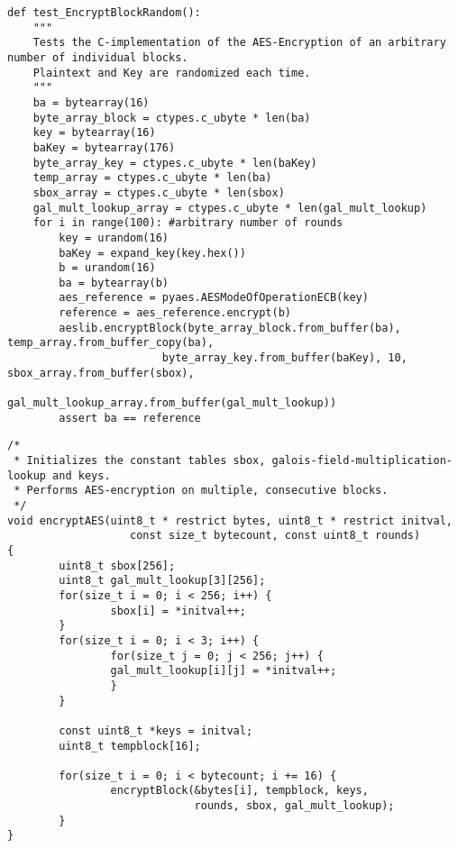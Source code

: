 \begin{lstlisting}
def test_EncryptBlockRandom():
    """
    Tests the C-implementation of the AES-Encryption of an arbitrary number of individual blocks.
    Plaintext and Key are randomized each time.
    """
    ba = bytearray(16)
    byte_array_block = ctypes.c_ubyte * len(ba)
    key = bytearray(16)
    baKey = bytearray(176)
    byte_array_key = ctypes.c_ubyte * len(baKey)
    temp_array = ctypes.c_ubyte * len(ba)
    sbox_array = ctypes.c_ubyte * len(sbox)
    gal_mult_lookup_array = ctypes.c_ubyte * len(gal_mult_lookup)
    for i in range(100): #arbitrary number of rounds
        key = urandom(16)
        baKey = expand_key(key.hex())
        b = urandom(16)
        ba = bytearray(b)
        aes_reference = pyaes.AESModeOfOperationECB(key)
        reference = aes_reference.encrypt(b)
        aeslib.encryptBlock(byte_array_block.from_buffer(ba), temp_array.from_buffer_copy(ba),
                        byte_array_key.from_buffer(baKey), 10, sbox_array.from_buffer(sbox),
                        gal_mult_lookup_array.from_buffer(gal_mult_lookup))
        assert ba == reference
\end{lstlisting}

\begin{lstlisting}
/*
 * Initializes the constant tables sbox, galois-field-multiplication-lookup and keys.
 * Performs AES-encryption on multiple, consecutive blocks.
 */
void encryptAES(uint8_t * restrict bytes, uint8_t * restrict initval, 
                   const size_t bytecount, const uint8_t rounds)
{   
        uint8_t sbox[256];
        uint8_t gal_mult_lookup[3][256];
        for(size_t i = 0; i < 256; i++) {
                sbox[i] = *initval++;
        }
        for(size_t i = 0; i < 3; i++) {
                for(size_t j = 0; j < 256; j++) {
                gal_mult_lookup[i][j] = *initval++;
                }
        }
        
        const uint8_t *keys = initval;
        uint8_t tempblock[16];
        
        for(size_t i = 0; i < bytecount; i += 16) {
                encryptBlock(&bytes[i], tempblock, keys, 
                             rounds, sbox, gal_mult_lookup);
        }
}
\end{lstlisting}


